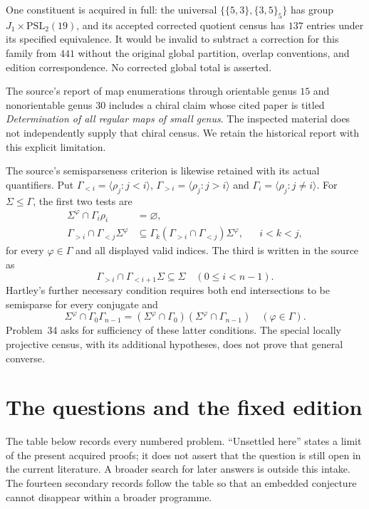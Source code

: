 \documentclass[11pt,a4paper]{article}
\newcommand{\gen}[1]{\langle #1\rangle}
\begin{document}
One constituent is acquired in full: the universal
$\{\{5,3\},\{3,5\}_5\}$ has group
$J_1\times\mathrm{PSL}_2(19)$, and its accepted corrected
quotient census has $137$ entries under its specified
equivalence. It would be invalid to subtract a correction
for this family from $441$ without the original global
partition, overlap conventions, and edition correspondence.
No corrected global total is asserted.

The source's report of map enumerations through orientable
genus $15$ and nonorientable genus $30$ includes a chiral
claim whose cited paper is titled \emph{Determination of
all regular maps of small genus}. The inspected material
does not independently supply that chiral census. We
retain the historical report with this explicit limitation.

The source's semisparseness criterion is likewise retained
with its actual quantifiers. Put
$\Gamma_{<i}=\gen{\rho_j:j<i}$,
$\Gamma_{>i}=\gen{\rho_j:j>i}$ and
$\Gamma_i=\gen{\rho_j:j\ne i}$.
For $\Sigma\le\Gamma$, the first two tests are
\begin{align*}
 \Sigma^\varphi\cap\Gamma_i\rho_i&=\varnothing,\\
 \Gamma_{>i}\cap\Gamma_{<j}\Sigma^\varphi
 &\subseteq\Gamma_k(\Gamma_{>i}\cap\Gamma_{<j})\Sigma^\varphi,
                    &&i<k<j,
\end{align*}
for every $\varphi\in\Gamma$ and all displayed valid indices.
The third is written in the source as
\[
 \Gamma_{>i}\cap\Gamma_{<i+1}\Sigma\subseteq\Sigma
                                      \quad(0\le i<n-1).
\]
Hartley's further necessary condition requires both end
intersections to be semisparse for every conjugate and
\[
 \Sigma^\varphi\cap\Gamma_0\Gamma_{n-1}
   =(\Sigma^\varphi\cap\Gamma_0)
      (\Sigma^\varphi\cap\Gamma_{n-1})
                   \quad(\varphi\in\Gamma).
\]
Problem~34 asks for sufficiency of these latter conditions.
The special locally projective census, with its additional
hypotheses, does not prove that general converse.

\section{The questions and the fixed edition}

The table below records every numbered problem. ``Unsettled
here'' states a limit of the present acquired proofs; it
does not assert that the question is still open in the
current literature. A broader search for later answers
is outside this intake. The fourteen secondary records
follow the table so that an embedded conjecture cannot
disappear within a broader programme.
\end{document}
